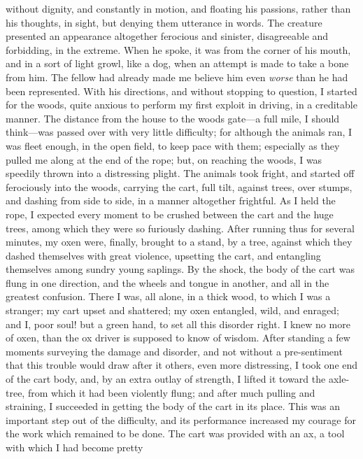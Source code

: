 without dignity, and constantly in motion, and floating his passions,
rather than his thoughts, in sight, but denying them utterance in words.
The creature presented an appearance altogether ferocious and sinister,
disagreeable and forbidding, in the extreme. When he spoke, it was from
the corner of his mouth, and in a sort of light growl, like a dog, when
an attempt is made to take a bone from him. The fellow had already made
me believe him even \emph{worse} than he had been represented. With his
directions, and without stopping to question, I started for the woods,
quite anxious to perform my first exploit in driving, in a creditable
manner. The distance from the house to the woods gate---a full mile, I
should think---was passed over with very little difficulty; for although
the animals ran, I was fleet enough, in the open field, to keep pace
with them; especially as they pulled me along at the end of the
{\protect\hypertarget{211}{}{}}rope; but, on reaching the woods, I was
speedily thrown into a distressing plight. The animals took fright, and
started off ferociously into the woods, carrying the cart, full tilt,
against trees, over stumps, and dashing from side to side, in a manner
altogether frightful. As I held the rope, I expected every moment to be
crushed between the cart and the huge trees, among which they were so
furiously dashing. After running thus for several minutes, my oxen were,
finally, brought to a stand, by a tree, against which they dashed
themselves with great violence, upsetting the cart, and entangling
themselves among sundry young saplings. By the shock, the body of the
cart was flung in one direction, and the wheels and tongue in another,
and all in the greatest confusion. There I was, all alone, in a thick
wood, to which I was a stranger; my cart upset and shattered; my oxen
entangled, wild, and enraged; and I, poor soul! but a green hand, to set
all this disorder right. I knew no more of oxen, than the ox driver is
supposed to know of wisdom. After standing a few moments surveying the
damage and disorder, and not without a pre-sentiment that this trouble
would draw after it others, even more distressing, I took one end of the
cart body, and, by an extra outlay of strength, I lifted it toward the
axle-tree, from which it had been violently flung; and after much
pulling and straining, I succeeded in getting the body of the cart in
its place. This was an important step out of the difficulty, and its
performance increased my courage for the work which remained to be done.
The cart was provided with an ax, a tool with which I had become pretty
